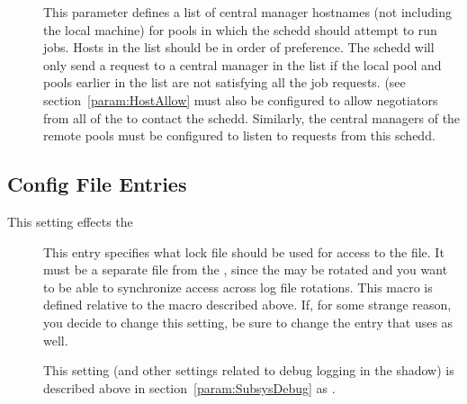 \begin{description}
\item[] \label{param:FlockHosts} This parameter
  defines a list of central manager hostnames (not including the local
   machine) for pools in which the schedd should
  attempt to run jobs.  Hosts in the list should be in order of
  preference.  The schedd will only send a request to a central
  manager in the list if the local pool and pools earlier in the list
  are not satisfying all the job requests.
   (see
  section~\ref{param:HostAllow} must also be configured to allow
  negotiators from all of the  to contact the
  schedd.  Similarly, the central managers of the remote pools must be
  configured to listen to requests from this schedd.

\end{description}

\subsection{ Config File Entries}
\label{sec:Shadow-Config-File-Entries}

This setting effects the 

\begin{description}

\item[] \label{param:ShadowLock} This entry
  specifies what lock file should be used for access to the
   file.  It must be a separate file from the
  , since the  may be rotated and you
  want to be able to synchronize access across log file rotations.
  This macro is defined relative to the  macro described
  above.  If, for some strange reason, you decide to change this
  setting, be sure to change the  entry that
   uses as well.

\item[] \label{param:ShadowDebug} This setting
  (and other settings related to debug logging in the shadow) is
  described above in section~\ref{param:SubsysDebug} as
  .

\end{description}

